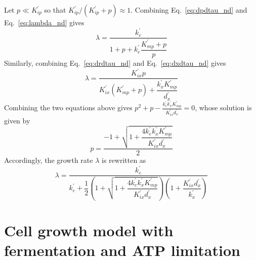 \documentclass[11pt]{article}
\begin{document}
{Let $p \ll K_{ip}^\prime$ so that $K_{ip}^{\prime}/(K_{ip}^{\prime}+p) \approx 1$. Combining Eq.~\ref{eq:dpdtau_nd} and Eq.~\ref{eq:lambda_nd} gives
\begin{equation}
\lambda = \frac{k_e^{\prime}}{1+p+k_e^{\prime}\dfrac{K_{mp}^{\prime}+p}{p}}
\end{equation}
Similarly, combining Eq.~\ref{eq:drdtau_nd} and Eq.~\ref{eq:dxdtau_nd} gives
\begin{equation}
\lambda = \frac{K_{ix}^{\prime}p}{K_{ix}^{\prime}(K_{mp}^{\prime}+p)+\dfrac{k_x^{\prime}K_{mp}^{\prime}}{d_x^{\prime}}}
\end{equation}
Combining the two equations above gives $p^2+p-\frac{k_e^{\prime}k_x^{\prime}K_{mp}^{\prime}}{K_{ix}^{\prime}d_x^{\prime}}=0$, whose solution is given by
\begin{equation}
p=\frac{-1+\sqrt{1+\dfrac{4k_e^{\prime}k_x^{\prime}K_{mp}^{\prime}}{K_{ix}^{\prime}d_x^{\prime}}}}{2}
\end{equation}
Accordingly, the growth rate $\lambda$ is rewritten as
\begin{equation}
\lambda = \frac{k_e^{\prime}}{k_e^{\prime}+\dfrac{1}{2}\left(1+\sqrt{1+\dfrac{4k_e^{\prime}k_x^{\prime}K_{mp}^\prime}{K_{ix}^{\prime}d_x^{\prime}}}\right)\left(1+\dfrac{K_{ix}^{\prime}d_x^{\prime}}{k_x^{\prime}}\right)}
\end{equation}

\section{Cell growth model with fermentation and ATP limitation}

}
\end{document}
